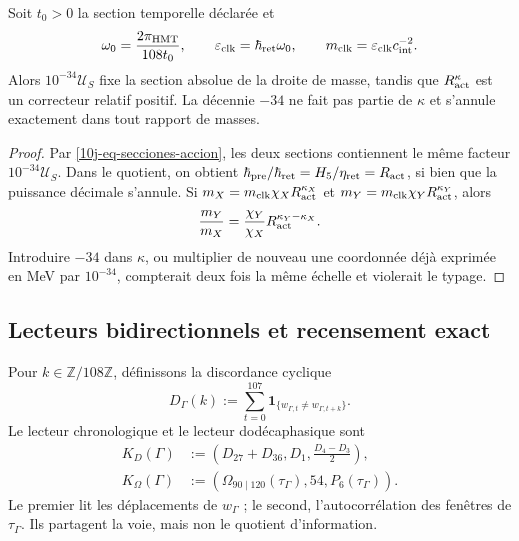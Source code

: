 \begin{proposition}
\label{10j-prop-escala-corrector}
Soit \(t_0>0\) la section temporelle déclarée et
\begin{equation}
 \omega_0=\frac{2\pi_{\rm HMT}}{108t_0},
 \qquad \varepsilon_{\rm clk}=\hbar_{\rm ret}\omega_0,
 \qquad m_{\rm clk}=\varepsilon_{\rm clk}c_{\rm int}^{-2}.
 \label{10j-eq-reloj-masa}
\end{equation}
Alors \(10^{-34}\mathcal U_S\) fixe la section absolue de la droite de masse, tandis que \(R_{\rm act}^{\kappa}\) est un correcteur relatif positif. La décennie \(-34\) ne fait pas partie de \(\kappa\) et s'annule exactement dans tout rapport de masses.
\end{proposition}

\begin{proof}
Par \eqref{10j-eq-secciones-accion}, les deux sections contiennent le même facteur \(10^{-34}\mathcal U_S\). Dans le quotient, on obtient \(\hbar_{\rm pre}/\hbar_{\rm ret}=H_5/\eta_{\rm ret}=R_{\rm act}\), si bien que la puissance décimale s'annule. Si \(m_X=m_{\rm clk}\chi_XR_{\rm act}^{\kappa_X}\) et \(m_Y=m_{\rm clk}\chi_YR_{\rm act}^{\kappa_Y}\), alors
\[
 \frac{m_Y}{m_X}
 =\frac{\chi_Y}{\chi_X}
  R_{\rm act}^{\kappa_Y-\kappa_X}.
\]
Introduire \(-34\) dans \(\kappa\), ou multiplier de nouveau une coordonnée déjà exprimée en MeV par \(10^{-34}\), compterait deux fois la même échelle et violerait le typage.
\end{proof}

\subsection{Lecteurs bidirectionnels et recensement exact}

Pour \(k\in\mathbb Z/108\mathbb Z\), définissons la discordance cyclique
\begin{equation}
 D_\Gamma(k):=
 \sum_{t=0}^{107}
 \mathbf1_{\{w_{\Gamma,t}\ne w_{\Gamma,t+k}\}}.
 \label{10j-eq-discrepancia}
\end{equation}
Le lecteur chronologique et le lecteur dodécaphasique sont
\begin{align}
 K_D(\Gamma)
 &:=\left(D_{27}+D_{36},D_1,\frac{D_4-D_3}{2}\right),
 \label{10j-eq-kd}\\
 K_\Omega(\Gamma)
 &:=(\Omega_{90\mid120}(\tau_\Gamma),54,P_6(\tau_\Gamma)).
 \label{10j-eq-komega}
\end{align}
Le premier lit les déplacements de \(w_\Gamma\) ; le second, l'autocorrélation des fenêtres de \(\tau_\Gamma\). Ils partagent la voie, mais non le quotient d'information.

